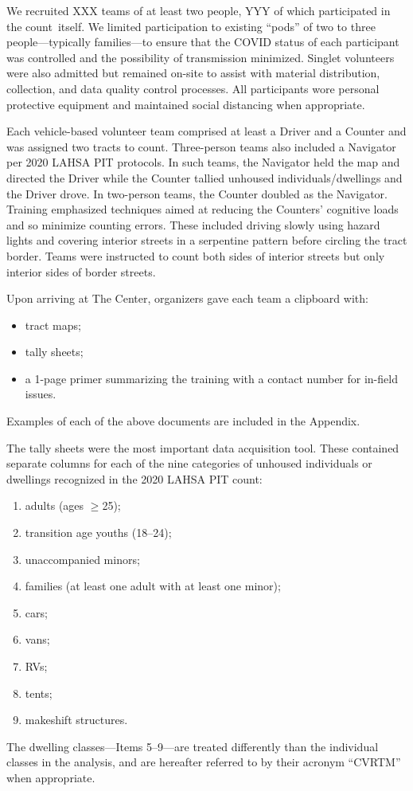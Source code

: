 \documentclass[11pt,twocolumn]{article}
\def\Count{count}
\begin{document}
We recruited XXX teams of at least two people, YYY of which participated in the \Count\ itself. We 
limited participation to existing ``pods'' of two to three people---typically families---to ensure that the 
COVID status of each participant was controlled and the possibility of transmission minimized. 
Singlet volunteers were also admitted but remained on-site to assist with material distribution, 
collection, and data quality control processes. All participants wore personal protective 
equipment and maintained social distancing when appropriate.

Each vehicle-based volunteer team comprised at least a Driver and a Counter and was assigned two tracts 
to count. Three-person teams also included a Navigator per 2020 LAHSA PIT protocols. In such teams, 
the Navigator held the map and directed the Driver while the Counter tallied unhoused individuals/dwellings 
and the Driver drove. In two-person teams, the Counter doubled as the Navigator. Training emphasized 
techniques aimed at reducing the Counters' cognitive loads and so minimize counting errors. 
These included driving slowly using hazard lights and covering interior streets in a serpentine pattern 
before circling the tract border. Teams were instructed to count both sides of interior streets but only
interior sides of border streets.

Upon arriving at The Center, organizers gave each team a clipboard with:
\begin{itemize}
	\item tract maps;
	\item tally sheets;
	\item a 1-page primer summarizing the training with a contact number for in-field issues.
\end{itemize}
Examples of each of the above documents are included in the Appendix.

The tally sheets were the most important data acquisition tool. These contained separate columns for
each of the nine categories of unhoused individuals or dwellings recognized in the 2020 LAHSA PIT
count: 
\begin{enumerate}
	\item adults (ages $\geq$25);
	\item transition age youths (18--24);
	\item unaccompanied minors;
	\item families (at least one adult with at least one minor); 
	\item cars;
	\item vans;
	\item RVs;
	\item tents;
	\item makeshift structures.
\end{enumerate}
The dwelling classes---Items 5--9---are treated differently than the individual classes in the analysis,
and are hereafter referred to by their acronym ``CVRTM'' when appropriate. 
\end{document}
